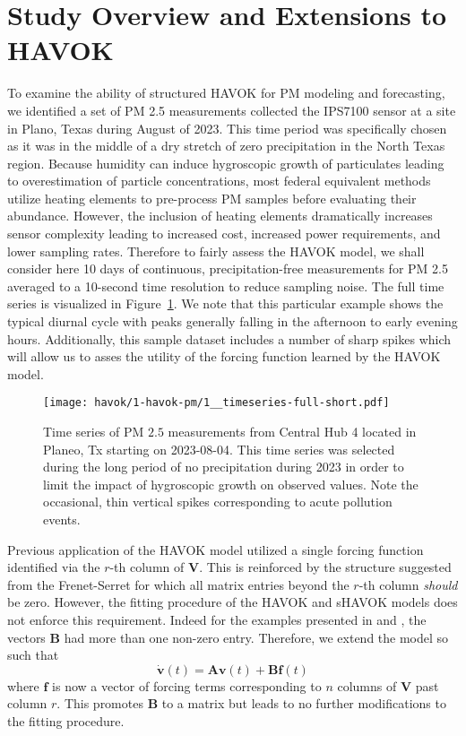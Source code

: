 \section{Study Overview and Extensions to HAVOK}

To examine the ability of structured HAVOK for PM modeling and
forecasting, we identified a set of PM 2.5 measurements collected the IPS7100 sensor
at a site in Plano, Texas during August of 2023. This time period was specifically
chosen as it was in the middle of a dry stretch of zero precipitation in the
North Texas region. Because humidity can induce hygroscopic growth of
particulates leading to overestimation of particle concentrations, most federal
equivalent methods utilize heating elements to pre-process PM samples
before evaluating their abundance. However, the inclusion of heating elements
dramatically increases sensor complexity leading to increased cost, increased
power requirements, and lower sampling rates. Therefore to fairly assess the
HAVOK model, we shall consider here 10 days of continuous, precipitation-free
measurements for PM 2.5 averaged to a 10-second time resolution to reduce
sampling noise. The full time series is visualized in
Figure~\ref{fig:pm-timeseries-orig}. We note that this particular example shows
the typical diurnal cycle with peaks  generally falling in the afternoon
to early evening hours. Additionally, this sample dataset includes a number of
sharp spikes which will allow us to asses the utility of the forcing function
learned by the HAVOK model.

\begin{figure}[h]
  \centering
  \texttt{[image: havok/1-havok-pm/1\_\_timeseries-full-short.pdf]}
  \caption{Time series of PM $2.5$ measurements from Central Hub 4 located in
    Planeo, Tx starting on 2023-08-04. This time series was selected during the
    long period of no precipitation during 2023 in order to limit the impact of
    hygroscopic growth on observed values. Note the occasional, thin vertical
    spikes corresponding to acute pollution events.}
  \label{fig:pm-timeseries-orig}
\end{figure}

Previous application of the HAVOK model utilized a single forcing function
identified via the $r$-th column of $\mathbf{V}$. This is reinforced by the
structure suggested from the Frenet-Serret for which all matrix entries beyond
the $r$-th column \textit{should} be zero. However, the fitting procedure of the
HAVOK and sHAVOK models does not enforce this requirement. Indeed for the
examples presented in \cite{brunton-havok-orig} and \cite{havok-diffgeo}, the
vectors $\mathbf{B}$ had more than one non-zero entry. Therefore, we extend the
model so such that
\begin{equation}
  \dot{\mathbf{v}}(t) = \mathbf{A}\mathbf{v}(t) + \mathbf{B}\mathbf{f}(t)
\end{equation}
where $\mathbf{f}$ is now a vector of forcing terms corresponding to $n$ columns
of $\mathbf{V}$ past column $r$. This promotes $\mathbf{B}$ to a matrix but
leads to no further modifications to the fitting procedure.

